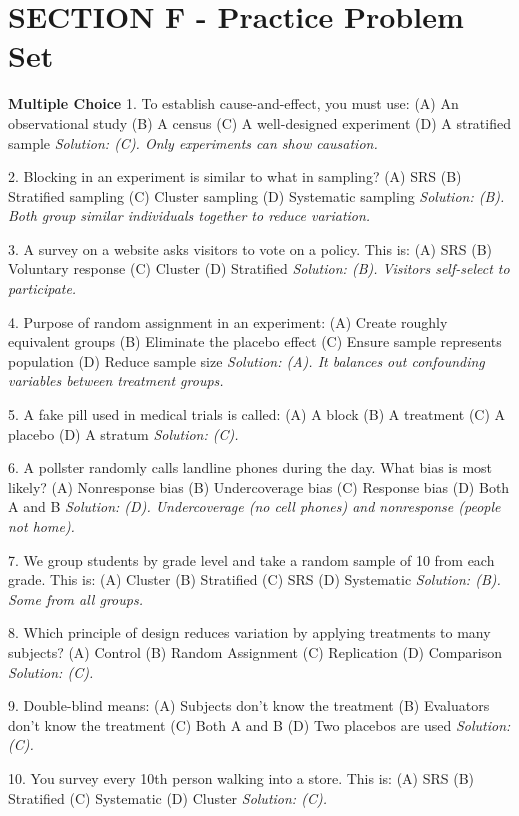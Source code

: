 \section{SECTION F - Practice Problem Set}
\begin{workbookbox}
\textbf{Multiple Choice}
1. To establish cause-and-effect, you must use:
(A) An observational study (B) A census (C) A well-designed experiment (D) A stratified sample
\textit{Solution: (C). Only experiments can show causation.}

2. Blocking in an experiment is similar to what in sampling?
(A) SRS (B) Stratified sampling (C) Cluster sampling (D) Systematic sampling
\textit{Solution: (B). Both group similar individuals together to reduce variation.}

3. A survey on a website asks visitors to vote on a policy. This is:
(A) SRS (B) Voluntary response (C) Cluster (D) Stratified
\textit{Solution: (B). Visitors self-select to participate.}

4. Purpose of random assignment in an experiment:
(A) Create roughly equivalent groups (B) Eliminate the placebo effect (C) Ensure sample represents population (D) Reduce sample size
\textit{Solution: (A). It balances out confounding variables between treatment groups.}

5. A fake pill used in medical trials is called:
(A) A block (B) A treatment (C) A placebo (D) A stratum
\textit{Solution: (C).}

6. A pollster randomly calls landline phones during the day. What bias is most likely?
(A) Nonresponse bias (B) Undercoverage bias (C) Response bias (D) Both A and B
\textit{Solution: (D). Undercoverage (no cell phones) and nonresponse (people not home).}

7. We group students by grade level and take a random sample of 10 from each grade. This is:
(A) Cluster (B) Stratified (C) SRS (D) Systematic
\textit{Solution: (B). Some from all groups.}

8. Which principle of design reduces variation by applying treatments to many subjects?
(A) Control (B) Random Assignment (C) Replication (D) Comparison
\textit{Solution: (C).}

9. Double-blind means:
(A) Subjects don't know the treatment (B) Evaluators don't know the treatment (C) Both A and B (D) Two placebos are used
\textit{Solution: (C).}

10. You survey every 10th person walking into a store. This is:
(A) SRS (B) Stratified (C) Systematic (D) Cluster
\textit{Solution: (C).}


\end{workbookbox}
